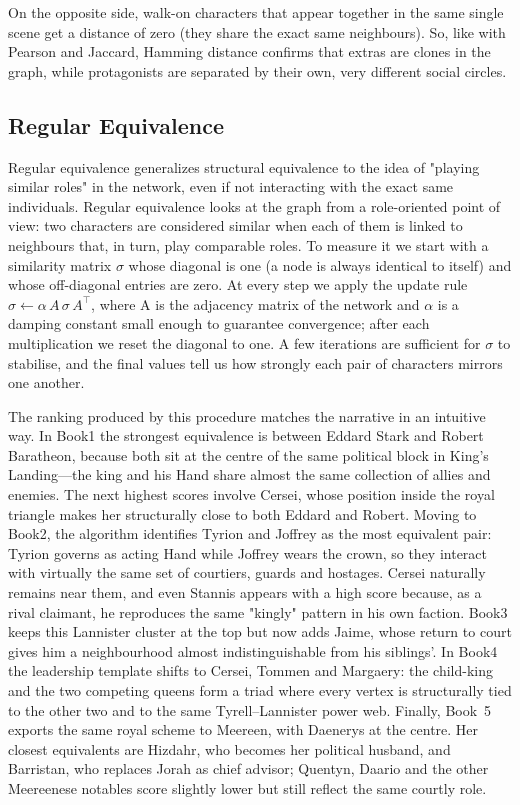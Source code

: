 \documentclass[12pt, a4paper]{article}
\begin{document}
On the opposite side, walk-on characters that appear together in the same single scene get a distance of zero (they share the exact same neighbours).
So, like with Pearson and Jaccard, Hamming distance confirms that extras are clones in the graph, while protagonists are separated by their own, very different social circles.

 
\subsection*{Regular Equivalence} 
Regular equivalence generalizes structural equivalence to the idea of "playing similar roles" in the network,  even if not interacting with the exact same individuals.
Regular equivalence looks at the graph from a role-oriented point of view: two characters are considered similar when each of them is linked to neighbours that, in turn, play comparable roles.
To measure it we start with a similarity matrix $\sigma$ whose diagonal is one (a node is always identical to itself) and whose off-diagonal entries are zero.
At every step we apply the update rule $\sigma \leftarrow \alpha\,A\,\sigma\,A^{\top}$, where A is the adjacency matrix of the network and $\alpha$ is a damping constant small enough to guarantee convergence; after each multiplication we reset the diagonal to one.
A few iterations are sufficient for $\sigma$ to stabilise, and the final values tell us how strongly each pair of characters mirrors one another.

The ranking produced by this procedure matches the narrative in an intuitive way.
In Book1 the strongest equivalence is between Eddard Stark and Robert Baratheon, because both sit at the centre of the same political block in King's Landing—the king and his Hand share almost the same collection of allies and enemies.
The next highest scores involve Cersei, whose position inside the royal triangle makes her structurally close to both Eddard and Robert.
Moving to Book2, the algorithm identifies Tyrion and Joffrey as the most equivalent pair: Tyrion governs as acting Hand while Joffrey wears the crown, so they interact with virtually the same set of courtiers, guards and hostages.
Cersei naturally remains near them, and even Stannis appears with a high score because, as a rival claimant, he reproduces the same "kingly" pattern in his own faction.
Book3 keeps this Lannister cluster at the top but now adds Jaime, whose return to court gives him a neighbourhood almost indistinguishable from his siblings'.
In Book4 the leadership template shifts to Cersei, Tommen and Margaery: the child-king and the two competing queens form a triad where every vertex is structurally tied to the other two and to the same Tyrell–Lannister power web.
Finally, Book~5 exports the same royal scheme to Meereen, with Daenerys at the centre.  Her closest equivalents are Hizdahr, who becomes her political husband, and Barristan, who replaces Jorah as chief advisor; Quentyn, Daario and the other Meereenese notables score slightly lower but still reflect the same courtly role.
\end{document}
